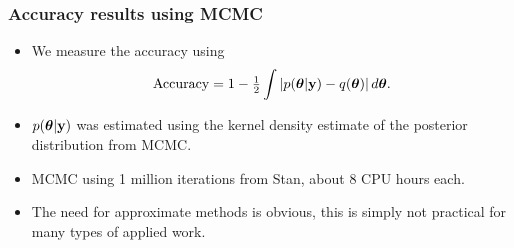 \documentclass{beamer}
\begin{document}

\begin{frame}
	\frametitle{Accuracy results using MCMC}
	\begin{itemize}
		\item	We measure the accuracy using
		      $$\text{Accuracy} = 1 - \tfrac{1}{2} \int \left |p({\boldsymbol \theta}|{\bf y}) - q({\boldsymbol \theta}) \right | d {\boldsymbol \theta}.$$
		\item	$p({\boldsymbol \theta}|{\bf y})$ was estimated using the kernel density estimate of the posterior
		      distribution from MCMC.
		\item MCMC using 1 million iterations from Stan, about 8 CPU hours each.
		\item The need for approximate methods is obvious, this is simply not
		      practical for many types of applied work.
	\end{itemize}
\end{frame}
\end{document}
